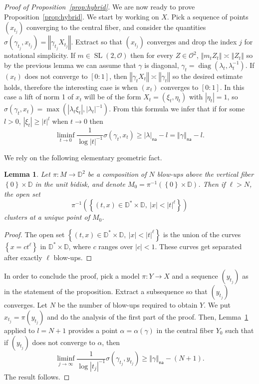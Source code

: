 \documentclass[11pt]{article}
\newtheorem{lemm}[theo]{Lemma}
\theoremstyle{definition}
\numberwithin{equation}{section}
\numberwithin{figure}{section}
\numberwithin{table}{section}
\DeclareMathOperator{\SL}{SL}
\DeclareMathOperator{\diag}{diag}
\newcommand{\dD}{\mathbb{D}}
\newcommand{\cv}{\rightarrow}
\newcommand{\set}[1]{\left\{#1\right\}}
\newcommand{\norm}[1]{\left\Vert#1\right\Vert}
\newcommand{\abs}[1]{\left\vert#1\right\vert}
\newcommand{\unsur}[1]{\frac{1}{#1}}
\newcommand{\lrpar}[1]{\left(#1\right)}
\newcommand{\la}{\lambda}
\newcommand{\na}{\mathsf{na}}
\newcommand{\inv}{^{-1}}
\begin{document}
\begin{proof}[Proof of Proposition~\ref{prop:hybrid}]
We are now ready to prove Proposition~\ref{prop:hybrid}. We start by working on $X$. Pick a sequence of points $(x_{t_j})$ converging to the central fiber, and consider the quantities $\sigma(\gamma_{t_j}, x_{t_j}) = \norm{\gamma_{t_j}X_{t_j}}$. Extract so that $(x_{t_j})$ converges and drop the index $j$ for notational simplicity. If $m\in \SL(2, \mathcal{O})$ then for every $Z\in \mathcal O^2$, $\norm{ m_t Z_t}\asymp \norm{Z_t}$ so by the previous lemma we can assume that $\gamma$ is diagonal, $\gamma_t =\diag(\lambda_t, \lambda_t\inv)$. If $(x_{t})$ does not converge to $[0:1]$, then $\norm{\gamma_{t}X_{t}} \asymp \norm{\gamma_{t}}$ so the desired estimate holds, therefore the interesting case is when $(x_{t})$ converges to $[0:1]$. In this case a lift of norm 1 of $x_t$ will be of the form $X_{t} = (\xi_t, \eta_t)$ with $\abs{\eta_t} = 1$, so $\sigma (\gamma_t, x_t) = \max(\abs{\la_t\xi_t}, \abs{\la_t}\inv)$. From this formula we infer that if for some $l>0$, $\abs{\xi_t} \geq \abs{t}^l$ when $t\cv 0$ then
\[
\liminf_{t\to 0} \unsur{\log\abs{t}\inv} \sigma (\gamma_t, x_t) \geq \abs{\la}_\na -l = \norm{\gamma}_\na -l.
\]

We rely on the following elementary geometric fact.

\begin{lemm}\label{lem:geometric}
Let $\pi:M\cv \dD^2$ be a composition of $N$ blow-ups above the vertical fiber $\set{0}\times \dD$ in the unit bidisk, and denote $M_0 = \pi\inv(\set{0}\times \dD)$.
Then if $\ell>N$, the open set
\[
\pi\inv\lrpar{\set{(t,x)\in \dD^*\times \dD, \ \abs{x}<\abs{t}^\ell}}
\]
clusters at a unique point of $M_0$.
\end{lemm}
\begin{proof}
The open set $\set{(t,x)\in \dD^*\times \dD, \ \abs{x}<\abs{t}^\ell}$ is the union of the curves $\set{ x= c t^\ell}$ in $\dD^*\times \dD$, where $c$ ranges over $\abs{c}<1$. These curves get separated after exactly $\ell$ blow-ups.
\end{proof}

In order to conclude the proof, pick a model $\pi: Y\to X$ and a sequence $(y_{t_j})$ as in the statement of the proposition. Extract a subsequence so that $(y_{t_j})$ converges. Let $N$ be the number of blow-ups required to obtain $Y$. We put $x_{t_j} = \pi(y_{t_j})$ and do the analysis of the first part of the proof. Then, Lemma~\ref{lem:geometric} applied to $l = N+1$ provides a point $\alpha = \alpha(\gamma)$ in the central fiber $Y_0$ such that if $(y_{t_j})$ does not converge to $\alpha$, then
\[
\liminf_{j\cv\infty} \unsur{\log\abs{t_j}\inv} \sigma (\gamma_{t_j}, y_{t_j}) \geq \norm{\gamma}_\na -(N+1).
\]
The result follows.
\end{proof}
\end{document}
